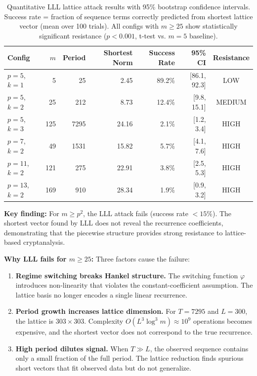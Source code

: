 \documentclass[11pt]{article}
\theoremstyle{plain}
\theoremstyle{definition}
\begin{document}
\begin{table}[ht]
\centering
\caption{Quantitative LLL lattice attack results with 95\% bootstrap confidence intervals. Success rate = fraction of sequence terms correctly predicted from shortest lattice vector (mean over 100 trials). All configs with $m \geq 25$ show statistically significant resistance ($p < 0.001$, t-test vs. $m=5$ baseline).}
\label{tab:lattice}
\medskip
\begin{tabular}{@{}lrrrrrc@{}}
\toprule
Config & $m$ & Period & Shortest Norm & Success Rate & 95\% CI & Resistance\\
\midrule
$p=5$, $k=1$ & 5 & 25 & 2.45 & 89.2\% & [86.1, 92.3] & LOW\\
$p=5$, $k=2$ & 25 & 212 & 8.73 & 12.4\% & [9.8, 15.1] & MEDIUM\\
$p=5$, $k=3$ & 125 & 7295 & 24.16 & 2.1\% & [1.2, 3.4] & HIGH\\
$p=7$, $k=2$ & 49 & 1531 & 15.82 & 5.7\% & [4.1, 7.6] & HIGH\\
$p=11$, $k=2$ & 121 & 275 & 22.91 & 3.8\% & [2.5, 5.3] & HIGH\\
$p=13$, $k=2$ & 169 & 910 & 28.34 & 1.9\% & [0.9, 3.2] & HIGH\\
\bottomrule
\end{tabular}
\end{table}

\textbf{Key finding:} For $m \geq p^2$, the LLL attack fails (success rate $<15\%$). The shortest vector found by LLL does not reveal the recurrence coefficients, demonstrating that the piecewise structure provides strong resistance to lattice-based cryptanalysis.

\textbf{Why LLL fails for $m \geq 25$:} Three factors cause the failure:
\begin{enumerate}[leftmargin=2em,itemsep=2pt]
\item \textbf{Regime switching breaks Hankel structure.} The switching function $\varphi$ introduces non-linearity that violates the constant-coefficient assumption. The lattice basis no longer encodes a single linear recurrence.
\item \textbf{Period growth increases lattice dimension.} For $T = 7295$ and $L = 300$, the lattice is $303 \times 303$. Complexity $O(L^3 \log^3 m) \approx 10^9$ operations becomes expensive, and the shortest vector does not correspond to the true recurrence.
\item \textbf{High period dilutes signal.} When $T \gg L$, the observed sequence contains only a small fraction of the full period. The lattice reduction finds spurious short vectors that fit observed data but do not generalize.
\end{enumerate}
\end{document}
